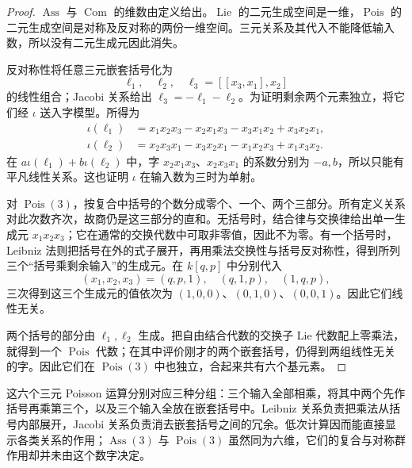 \begin{proof}
	\(\operatorname{Ass}\) 与 \(\operatorname{Com}\) 的维数由定义给出。\(\operatorname{Lie}\) 的二元生成空间是一维，\(\operatorname{Pois}\) 的二元生成空间是对称及反对称的两份一维空间。三元关系及其代入不能降低输入数，所以没有二元生成元因此消失。

	反对称性将任意三元嵌套括号化为
	\[
		\ell_1,\quad \ell_2,\quad \ell_3=[[x_3,x_1],x_2]
	\]
	的线性组合；Jacobi 关系给出 \(\ell_3=-\ell_1-\ell_2\)。为证明剩余两个元素独立，将它们经 \(\iota\) 送入字模型。所得为
	\[
		\begin{aligned}
			\iota(\ell_1)&=x_1x_2x_3-x_2x_1x_3-x_3x_1x_2+x_3x_2x_1,\\
			\iota(\ell_2)&=x_2x_3x_1-x_3x_2x_1-x_1x_2x_3+x_1x_3x_2.
		\end{aligned}
	\]
	在 \(a\iota(\ell_1)+b\iota(\ell_2)\) 中，字 \(x_2x_1x_3\)、\(x_2x_3x_1\) 的系数分别为 \(-a,b\)，所以只能有平凡线性关系。这也证明 \(\iota\) 在输入数为三时为单射。

	对 \(\operatorname{Pois}(3)\)，按复合中括号的个数分成零个、一个、两个三部分。所有定义关系对此次数齐次，故商仍是这三部分的直和。无括号时，结合律与交换律给出单一生成元 \(x_1x_2x_3\)；它在通常的交换代数中可取非零值，因此不为零。有一个括号时，Leibniz 法则把括号在外的式子展开，再用乘法交换性与括号反对称性，得到所列三个“括号乘剩余输入”的生成元。在 \(k[q,p]\) 中分别代入
	\[
		(x_1,x_2,x_3)=(q,p,1),\quad(q,1,p),\quad(1,q,p),
	\]
	三次得到这三个生成元的值依次为 \((1,0,0)\)、\((0,1,0)\)、\((0,0,1)\)。因此它们线性无关。

	两个括号的部分由 \(\ell_1,\ell_2\) 生成。把自由结合代数的交换子 Lie 代数配上零乘法，就得到一个 \(\operatorname{Pois}\) 代数；在其中评价刚才的两个嵌套括号，仍得到两组线性无关的字。因此它们在 \(\operatorname{Pois}(3)\) 中也独立，合起来共有六个基元素。
\end{proof}

这六个三元 Poisson 运算分别对应三种分组：三个输入全部相乘，将其中两个先作括号再乘第三个，以及三个输入全放在嵌套括号中。Leibniz 关系负责把乘法从括号内部展开，Jacobi 关系负责消去嵌套括号之间的冗余。低次计算因而能直接显示各类关系的作用；\(\operatorname{Ass}(3)\) 与 \(\operatorname{Pois}(3)\) 虽然同为六维，它们的复合与对称群作用却并未由这个数字决定。
